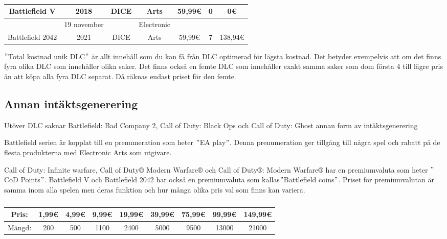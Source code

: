 \documentclass[11p]{article}
\begin{document}
\begin{otherlanguage}{swedish}
\begin{table}[htbp]
\begin{tabular}{|c|c|c|c|c|c|c|}
            Battlefield V & 2018 & DICE & Arts & 59,99€ & 0 & 0€\\
            \hline
            & 19 november && Electronic &&&\\ [-2pt]
            Battlefield 2042 & 2021 & DICE &  Arts & 59,99€ & 7 & 138,94€\\
            \hline
        \end{tabular}
        \caption{}
        \label{tab:Resultat}
    \end{table}
    \("\)Total kostnad unik DLC\("\) är allt innehåll som du kan få från DLC optimerad för lägsta kostnad.
    Det betyder exempelvis att om det finns fyra olika DLC som innehåller olika saker.
    Det finns också en femte DLC som innehåller exakt samma saker som dom första 4 till lägre pris än att köpa alla fyra DLC separat.
    Då räknas endast priset för den femte.

    \subsection{Annan intäktsgenerering}
    Utöver DLC saknar Battlefield: Bad Company 2, Call of Duty: Black Ops och Call of Duty: Ghost annan form av intäktsgenerering

    Battlefield serien är kopplat till en prenumeration som heter \("\)EA play\("\).
    Denna prenumeration ger tillgång till några spel och rabatt på de flesta produkterna med Electronic Arts som utgivare.

    Call of Duty: Infinite warfare, Call of Duty® Modern Warfare® och Call of Duty®: Modern Warfare® har en premiumvaluta som heter \("\)CoD Points\("\).
    Battlefield V och Battlefield 2042 har också en premiumvaluta som kallas\("\)Battlefield coins\("\).
    Priset för premiumvalutan är samma inom alla spelen men deras funktion och hur många olika pris val som finns kan variera.
    \begin{table}[htbp]
        \begin{tabular}{|c|c|c|c|c|c|c|c|c|}
            \hline
            Pris:  & 1,99€ & 4,99€ & 9,99€ & 19,99€ & 39,99€ & 75,99€ & 99,99€ & 149,99€ \\
            \hline
            Mängd: & 200 & 500 & 1100 & 2400 & 5000 & 9500 & 13000 & 21000\\
            \hline
        \end{tabular}
        \caption{}
        \label{tab:Premium}
    \end{table}



\end{otherlanguage}
\end{document}

